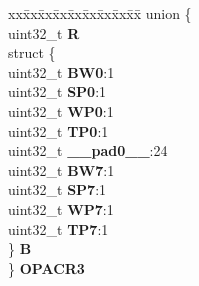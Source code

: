 \begin{DoxyCompactItemize}
\begin{tabbing}
\end{tabbing}\item 
\mbox{\label{structPBRIDGE__B__tag_af409d925643e5af090a898e46715daad}} 
\begin{tabbing}
xx\=xx\=xx\=xx\=xx\=xx\=xx\=xx\=xx\=\kill
union \{\\
\>uint32\_t {\bfseries R}\\
\>struct \{\\
\>\>uint32\_t {\bfseries BW0}:1\\
\>\>uint32\_t {\bfseries SP0}:1\\
\>\>uint32\_t {\bfseries WP0}:1\\
\>\>uint32\_t {\bfseries TP0}:1\\
\>\>uint32\_t {\bfseries \_\_pad0\_\_}:24\\
\>\>uint32\_t {\bfseries BW7}:1\\
\>\>uint32\_t {\bfseries SP7}:1\\
\>\>uint32\_t {\bfseries WP7}:1\\
\>\>uint32\_t {\bfseries TP7}:1\\
\>\} {\bfseries B}\\
\} {\bfseries OPACR3}\\


\end{tabbing}
\end{DoxyCompactItemize}
